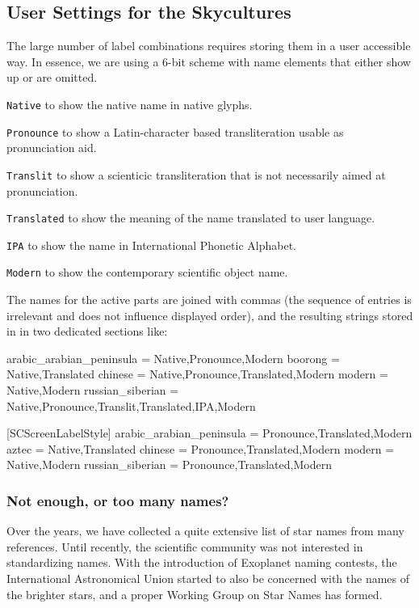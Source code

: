 \subsection{User Settings for the Skycultures}
\label{SC:settings}

The large number of label combinations requires storing them in a user accessible way. In essence, we are using a 6-bit scheme with name elements that either show up or are omitted.
\begin{description}
\item{\texttt{Native}} to show the native name in native glyphs.
\item{\texttt{Pronounce}} to show a Latin-character based transliteration usable as pronunciation aid.
\item{\texttt{Translit}} to show a scienticic transliteration that is not necessarily aimed at pronunciation.
\item{\texttt{Translated}} to show the meaning of the name translated to user language. 
\item{\texttt{IPA}} to show the name in International Phonetic Alphabet.
\item{\texttt{Modern}} to show the contemporary scientific object name.
\end{description}

The names for the active parts are joined with commas (the sequence of entries is irrelevant and does not influence displayed order), 
and the resulting strings stored in  in two dedicated sections like: 
\begin{configfile}[\scriptsize]
[SCInfoLabelStyle]
arabic_arabian_peninsula  = Native,Pronounce,Modern
boorong                   = Native,Translated
chinese                   = Native,Pronounce,Translated,Modern
modern                    = Native,Modern
russian_siberian          = Native,Pronounce,Translit,Translated,IPA,Modern

[SCScreenLabelStyle]
arabic_arabian_peninsula  = Pronounce,Translated,Modern
aztec                     = Native,Translated
chinese                   = Pronounce,Translated,Modern
modern                    = Native,Modern
russian_siberian          = Pronounce,Translated,Modern
\end{configfile}



\subsubsection{Not enough, or too many names?}
\label{sec:skycultures:fallback_names}
Over the years, we have collected a quite extensive list of star names from many references. 
Until recently, the scientific community was not interested in standardizing names. 
With the introduction of Exoplanet naming contests, the International Astronomical Union started 
to also be concerned with the names of the brighter stars, and a proper Working Group on Star Names has formed. 

